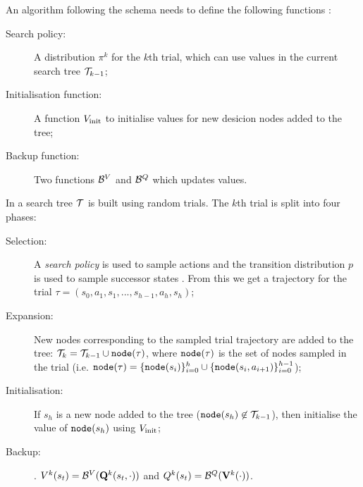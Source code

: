         An algorithm following the \thtspp\ewe schema needs to define the following functions :
        \begin{description}
            \item[Search policy:]
                A distribution  $\pi^{k}$ for the $k$th trial, which can use values in the current search tree $\mathcal{T}_{k-1}$;
            \item[Initialisation function:]
                A function $V_{\text{init}}$ to initialise values for new desicion nodes added to the tree;
            \item[Backup function:]
                Two functions $\mathcal{B}^V$ and $\mathcal{B}^Q$ which updates values. 

        \end{description}

        In \thtspp\ewe a search tree $\mathcal{T}$ is built using random trials. The $k$th trial is split into four phases:
        
        \begin{description}
            \item[Selection:] 
                A \textit{search policy} is used to sample actions and the transition distribution $p$ is used to sample successor states . From this we get a trajectory for the trial $\tau=(s_0,a_1,s_1,...,s_{h-1},a_h,s_h)$;
            \item[Expansion:]
                New nodes corresponding to the sampled trial trajectory are added to the tree: $\mathcal{T}_k = \mathcal{T}_{k-1} \cup {\texttt{node}}(\tau)$, where ${\texttt{node}}(\tau)$ is the set of nodes sampled in the trial (i.e. ${\texttt{node}}(\tau) = \{{\texttt{node}}(s_i)\}_{i=0}^h \cup \{{\texttt{node}}(s_i,a_{i+1})\}_{i=0}^{h-1}$);
            \item[Initialisation:]
                If $s_h$ is a new node added to the tree (${\texttt{node}}(s_h)\not\in\mathcal{T}_{k-1}$), then initialise the value of ${\texttt{node}}(s_h)$ using $V_{\text{init}}$;
            \item[Backup:]
                . $V^{k}(s_t) = \mathcal{B}^V(\mathbf{Q}^{k}(s_t,\cdot))$ and $Q^{k}(s_t) = \mathcal{B}^Q(\mathbf{V}^{k}(\cdot))$.
        \end{description}



